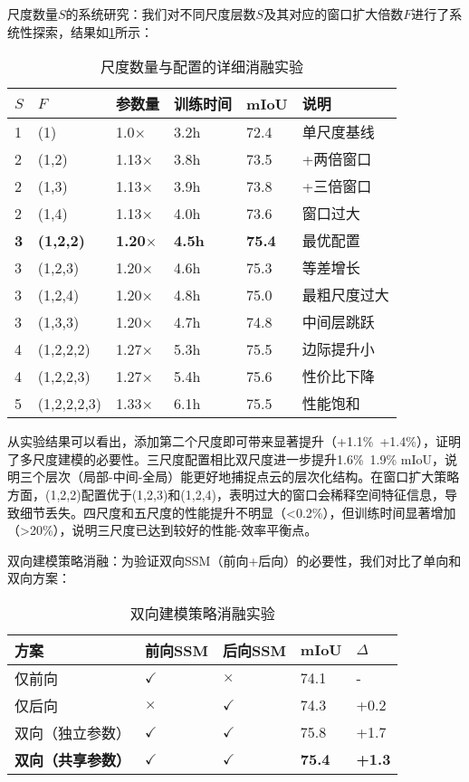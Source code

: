 \documentclass[preprint,12pt]{elsarticle}
\begin{document}
尺度数量$S$的系统研究：我们对不同尺度层数$S$及其对应的窗口扩大倍数$F$进行了系统性探索，结果如\cref{tab:scale_number}所示：

\begin{table}[htbp!]
	\centering
	\caption{尺度数量与配置的详细消融实验}
	\label{tab:scale_number}
	\begin{tabular}{@{}llllll@{}}
		\toprule
		$S$ & $F$ & 参数量 & 训练时间 & mIoU & 说明 \\ 
		\midrule
		1 & (1) & 1.0$\times$ & 3.2h & 72.4 & 单尺度基线 \\
		\midrule
		2 & (1,2) & 1.13$\times$ & 3.8h & 73.5 & +两倍窗口 \\
		2 & (1,3) & 1.13$\times$ & 3.9h & 73.8 & +三倍窗口 \\
		2 & (1,4) & 1.13$\times$ & 4.0h & 73.6 & 窗口过大 \\
		\midrule
		\textbf{3} & \textbf{(1,2,2)} & \textbf{1.20$\times$} & \textbf{4.5h} & \textbf{75.4} & 最优配置 \\
		3 & (1,2,3) & 1.20$\times$ & 4.6h & 75.3 & 等差增长 \\
		3 & (1,2,4) & 1.20$\times$ & 4.8h & 75.0 & 最粗尺度过大 \\
		3 & (1,3,3) & 1.20$\times$ & 4.7h & 74.8 & 中间层跳跃 \\
		\midrule
		4 & (1,2,2,2) & 1.27$\times$ & 5.3h & 75.5 & 边际提升小 \\
		4 & (1,2,2,3) & 1.27$\times$ & 5.4h & 75.6 & 性价比下降 \\
		5 & (1,2,2,2,3) & 1.33$\times$ & 6.1h & 75.5 & 性能饱和 \\
		\bottomrule
	\end{tabular}
\end{table}

从实验结果可以看出，添加第二个尺度即可带来显著提升（+1.1\%~+1.4\%），证明了多尺度建模的必要性。三尺度配置相比双尺度进一步提升1.6\%~1.9\% mIoU，说明三个层次（局部-中间-全局）能更好地捕捉点云的层次化结构。在窗口扩大策略方面，(1,2,2)配置优于(1,2,3)和(1,2,4)，表明过大的窗口会稀释空间特征信息，导致细节丢失。四尺度和五尺度的性能提升不明显（<0.2\%），但训练时间显著增加（>20\%），说明三尺度已达到较好的性能-效率平衡点。

双向建模策略消融：为验证双向SSM（前向+后向）的必要性，我们对比了单向和双向方案：

\begin{table}[htbp!]
	\centering
	\caption{双向建模策略消融实验}
	\label{tab:bidirectional_ablation}
	\begin{tabular}{@{}lllll@{}}
		\toprule
		方案 & 前向SSM & 后向SSM & mIoU & $\Delta$ \\ 
		\midrule
		仅前向 & $\checkmark$ & $\times$ & 74.1 & - \\
		仅后向 & $\times$ & $\checkmark$ & 74.3 & +0.2 \\
		\midrule
		双向（独立参数） & $\checkmark$ & $\checkmark$ & 75.8 & +1.7 \\
		\textbf{双向（共享参数）} & $\checkmark$ & $\checkmark$ & \textbf{75.4} & \textbf{+1.3} \\
		\bottomrule
	\end{tabular}
\end{table}
\end{document}
